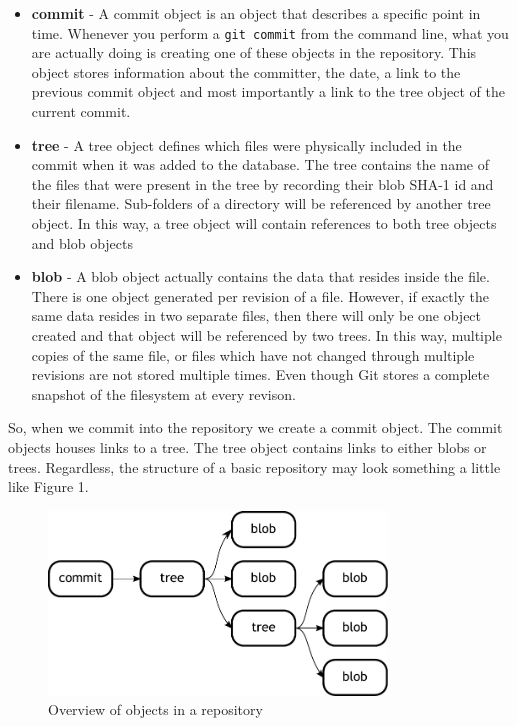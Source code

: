 \begin{itemize}
\item\textbf{commit} - A commit object is an object that describes a specific point in time.
Whenever you perform a \texttt{git commit} from the command line, what you are actually doing is creating one of these objects in the repository.
This object stores information about the committer, the date, a link to the previous commit object and most importantly a link to the tree object of the current commit.
\item\textbf{tree} - A tree object defines which files were physically included in the commit when it was added to the database.
The tree contains the name of the files that were present in the tree by recording their blob SHA-1 id and their filename.
Sub-folders of a directory will be referenced by another tree object.
In this way, a tree object will contain references to both tree objects and blob objects
\item\textbf{blob} - A blob object actually contains the data that resides inside the file.
There is one object generated per revision of a file.
However, if exactly the same data resides in two separate files, then there will only be one object created and that object will be referenced by two trees.
In this way, multiple copies of the same file, or files which have not changed through multiple revisions are not stored multiple times.
Even though Git stores a complete snapshot of the filesystem at every revison.
\end{itemize}

So, when we commit into the repository we create a commit object.
The commit objects houses links to a tree.
The tree object contains links to either blobs or trees.
Regardless, the structure of a basic repository may look something a little like Figure 1.

\begin{figure}[hbt]
\centering
\includegraphics[width=9cm]{images/f-af2-d1.pdf}
\caption{Overview of objects in a repository}
\end{figure}

